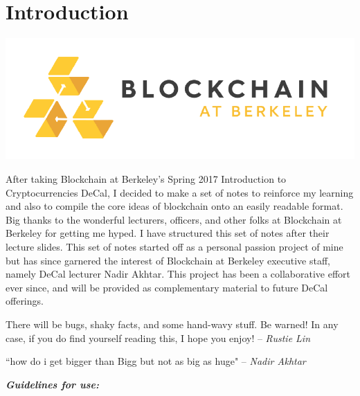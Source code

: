 \documentclass[full.tex]{subfiles}
\begin{document}
    \thispagestyle{firstpage}
    \vspace*{2\baselineskip}
    \section*{Introduction}
    
    \begin{center}
         \includegraphics[scale=0.5]{bab}
    \end{center}
     
     
    After taking Blockchain at Berkeley's Spring 2017 Introduction to Cryptocurrencies DeCal, I decided to make a set of notes to reinforce my learning and also to compile the core ideas of blockchain onto an easily readable format. Big thanks to the wonderful lecturers, officers, and other folks at Blockchain at Berkeley for getting me hyped. I have structured this set of notes after their lecture slides. This set of notes started off as a personal passion project of mine but has since garnered the interest of Blockchain at Berkeley executive staff, namely DeCal lecturer Nadir Akhtar. This project has been a collaborative effort ever since, and will be provided as complementary material to future DeCal offerings.
    
    There will be bugs, shaky facts, and some hand-wavy stuff. Be warned! In any case, if you do find yourself reading this, I hope you enjoy! -- \textit{Rustie Lin} 
    
    \medskip
    
    ``how do i get bigger than Bigg but not as big as huge" -- \textit{Nadir Akhtar}
    
    \bigskip
    
    \noindent \textbf{\textit{Guidelines for use:}}
    
\end{document}
